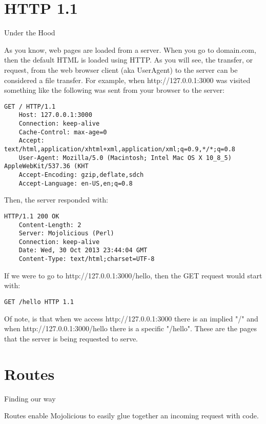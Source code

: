 \documentclass[14pt]{extreport}
\begin{document}
\section{HTTP 1.1}

{\Large Under the Hood}

As you know, web pages are loaded from a server. When you go to domain.com,
then the default HTML is loaded using HTTP.  As you will see, the transfer, or
request, from the web browser client (aka UserAgent) to the server can be
considered a file transfer. For example, when http://127.0.0.1:3000 was visited
something like the following was sent from your browser to the server:

\begin{lstlisting}[style=BlockStyle]
    GET / HTTP/1.1
    Host: 127.0.0.1:3000
    Connection: keep-alive
    Cache-Control: max-age=0
    Accept: text/html,application/xhtml+xml,application/xml;q=0.9,*/*;q=0.8
    User-Agent: Mozilla/5.0 (Macintosh; Intel Mac OS X 10_8_5) AppleWebKit/537.36 (KHT
    Accept-Encoding: gzip,deflate,sdch
    Accept-Language: en-US,en;q=0.8
\end{lstlisting}

Then, the server responded with:

\begin{lstlisting}[style=BlockStyle]
    HTTP/1.1 200 OK
    Content-Length: 2
    Server: Mojolicious (Perl)
    Connection: keep-alive
    Date: Wed, 30 Oct 2013 23:44:04 GMT
    Content-Type: text/html;charset=UTF-8
\end{lstlisting}

If we were to go to http://127.0.0.1:3000/hello, then the GET request would
start with:

\begin{lstlisting}[style=BlockStyle]
    GET /hello HTTP 1.1
\end{lstlisting}

Of note, is that when we access http://127.0.0.1:3000 there is an implied "/"
and when http://127.0.0.1:3000/hello there is a specific "/hello".  These are
the pages that the server is being requested to serve.

\section{Routes}

{\Large Finding our way}

Routes enable Mojolicious to easily glue together an incoming request with
code.
\end{document}
